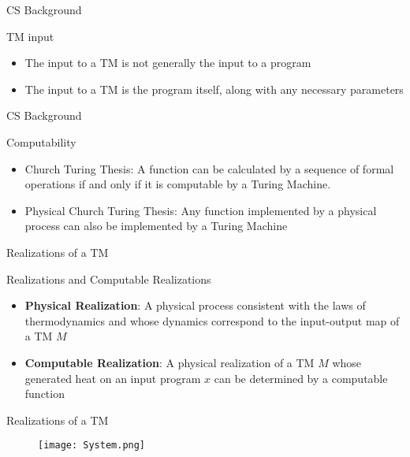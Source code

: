 \begin{frame}{CS Background}
\begin{block} {TM input}
\begin{itemize}
	\item The input to a TM is not generally the input to a program
	\item The input to a TM is the program itself, along with any necessary parameters
\end{itemize}
\end{block}
\end{frame}

\begin{frame}{CS Background}
    \begin{block}{Computability}
    \begin{itemize}
        \item Church Turing Thesis: A function can be calculated by a sequence of formal operations if and only if it is computable by a Turing Machine.
       \item Physical Church Turing Thesis: Any function implemented by a physical process can also be implemented by a Turing Machine
    \end{itemize}
    \end{block}
\end{frame}



\begin{frame}{Realizations of a TM}
    \begin{block}{Realizations and Computable Realizations}
    \begin{itemize}
        \item \textbf{Physical Realization}: A physical process consistent with the laws of thermodynamics and whose dynamics correspond to the input-output map of a TM $M$
        \item \textbf{Computable Realization}: A physical realization of a TM $M$ whose generated heat on an input program $x$ can be determined by a computable function
    \end{itemize}
    \end{block}
\end{frame}

\begin{frame}{Realizations of a TM}

    \begin{figure}
            \centering
            \texttt{[image: System.png]}
            \label{fig:my_label2}
        \end{figure}
    
\end{frame}